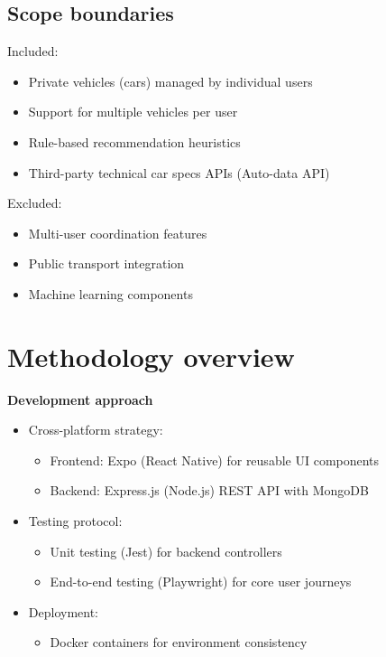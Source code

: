 \subsection{Scope boundaries}

Included:

\begin{itemize}
    \item Private vehicles (cars) managed by individual users
    
    \item Support for multiple vehicles per user
    
    \item Rule-based recommendation heuristics
    
    \item Third-party technical car specs APIs (Auto-data API)
\end{itemize}

Excluded:

\begin{itemize}
    \item Multi-user coordination features
    
    \item Public transport integration
    
    \item Machine learning components
\end{itemize}

\section{Methodology overview}

\textbf{Development approach}

\begin{itemize}
    \item Cross-platform strategy:
    \begin{itemize}
        \item Frontend: Expo (React Native) for reusable UI components
        \item Backend: Express.js (Node.js) REST API with MongoDB
    \end{itemize}
    
    \item Testing protocol:
    \begin{itemize}
        \item Unit testing (Jest) for backend controllers
        \item End-to-end testing (Playwright) for core user journeys
    \end{itemize}
    
    \item Deployment:
    \begin{itemize}
        \item Docker containers for environment consistency
    \end{itemize}
\end{itemize}
